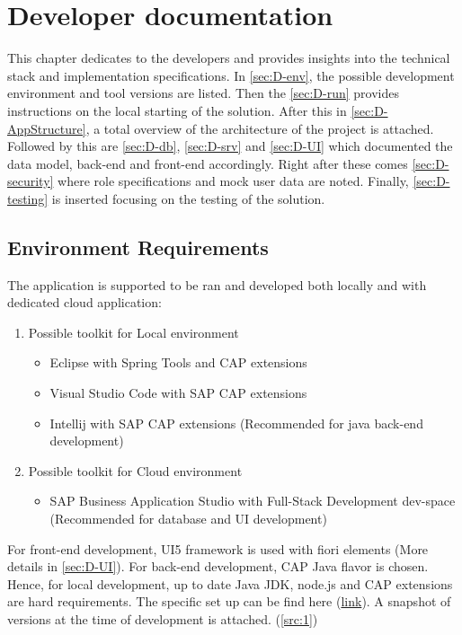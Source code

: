 \chapter{Developer documentation}
\label{ch:impl}

This chapter dedicates to the developers and provides insights into the technical stack and implementation specifications. In \autoref{sec:D-env}, the possible development environment and tool versions are listed. Then the \autoref{sec:D-run} provides instructions on the local starting of the solution. After this in \autoref{sec:D-AppStructure}, a total overview of the architecture of the project is attached. Followed by this are \autoref{sec:D-db}, \autoref{sec:D-srv} and \autoref{sec:D-UI} which documented the data model, back-end and front-end accordingly. Right after these comes \autoref{sec:D-security} where role specifications and mock user data are noted. Finally, \autoref{sec:D-testing} is inserted focusing on the testing of the solution. 

\section{Environment Requirements}
\label{sec:D-env}

The application is supported to be ran and developed both locally and with dedicated cloud application: 
\begin{enumerate}
    \item Possible toolkit for Local environment
        \begin{itemize}
            \item Eclipse with Spring Tools and CAP extensions
            \item Visual Studio Code with SAP CAP extensions
            \item Intellij with SAP CAP extensions (Recommended for java back-end development)
        \end{itemize}
    \item Possible toolkit for Cloud environment
        \begin{itemize}
            \item SAP Business Application Studio with Full-Stack Development dev-space (Recommended for database and UI development)
        \end{itemize}
\end{enumerate}

For front-end development, UI5 framework is used with fiori elements (More details in \ref{sec:D-UI}). 
For back-end development, CAP Java flavor is chosen.
Hence, for local development, up to date Java JDK, node.js and CAP extensions are hard requirements. The specific set up can be find here (\hyperlink{https://developers.sap.com/tutorials/btp-app-prepare-dev-environment-cap.html}{link}).
A snapshot of versions at the time of development is attached. (\autoref{src:1})

